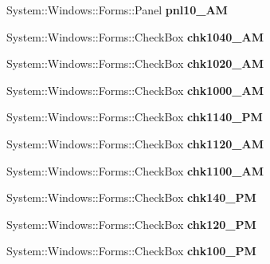 \begin{DoxyCompactItemize}
System\+::\+Windows\+::\+Forms\+::\+Panel {\bfseries pnl10\+\_\+AM}
\item 
\mbox{\label{class_project1_1_1_my_form_ad7e33c92797e995e517d7ebf5b7f0087}} 
System\+::\+Windows\+::\+Forms\+::\+Check\+Box {\bfseries chk1040\+\_\+AM}
\item 
\mbox{\label{class_project1_1_1_my_form_ac7e705ea46fa5373db65bb1e3f07529d}} 
System\+::\+Windows\+::\+Forms\+::\+Check\+Box {\bfseries chk1020\+\_\+AM}
\item 
\mbox{\label{class_project1_1_1_my_form_ad362215138869bf74614021ddd0af16b}} 
System\+::\+Windows\+::\+Forms\+::\+Check\+Box {\bfseries chk1000\+\_\+AM}
\item 
\mbox{\label{class_project1_1_1_my_form_a278089d58a3024c9db43a54933d87d3b}} 
System\+::\+Windows\+::\+Forms\+::\+Check\+Box {\bfseries chk1140\+\_\+PM}
\item 
\mbox{\label{class_project1_1_1_my_form_a511bc3f628eb98192121801eb3ef5c3d}} 
System\+::\+Windows\+::\+Forms\+::\+Check\+Box {\bfseries chk1120\+\_\+AM}
\item 
\mbox{\label{class_project1_1_1_my_form_a98b4727356c2d2fa84aded18ad77aab6}} 
System\+::\+Windows\+::\+Forms\+::\+Check\+Box {\bfseries chk1100\+\_\+AM}
\item 
\mbox{\label{class_project1_1_1_my_form_af03b821ae68e2ff605c89812747f3c1c}} 
System\+::\+Windows\+::\+Forms\+::\+Check\+Box {\bfseries chk140\+\_\+PM}
\item 
\mbox{\label{class_project1_1_1_my_form_aca71a27c167c50449ffc6d049307f38c}} 
System\+::\+Windows\+::\+Forms\+::\+Check\+Box {\bfseries chk120\+\_\+PM}
\item 
\mbox{\label{class_project1_1_1_my_form_af23bcbc3b7c992659952820cb019d740}} 
System\+::\+Windows\+::\+Forms\+::\+Check\+Box {\bfseries chk100\+\_\+PM}
\item 

\end{DoxyCompactItemize}
